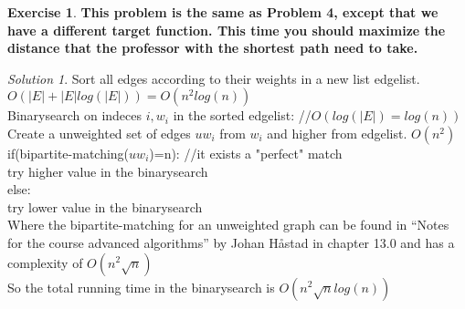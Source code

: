 \documentclass[a4paper,twoside=false,abstract=false,numbers=noenddot,
titlepage=false,headings=small,parskip=half,version=last]{scrartcl}
\theoremstyle{definition}
\newtheorem{exercise}{Exercise}
\theoremstyle{remark}
\newtheorem*{solution}{Solution}
\newcommand{\tab}{\hspace*{2em}}
\begin{document}
\begin{exercise}
{\bf
This problem is the same as Problem 4, except that we have a different target function.
This time you should maximize the distance that the professor with the shortest path need to take.
}
\end{exercise}
\begin{solution}

Sort all edges according to their weights in a new list edgelist.
$O(|E|+|E|log(|E|))=O(n^2log(n))$ \\

Binarysearch on indeces $i,w_i$ in the sorted edgelist: //$O(log(|E|)=log(n))$ \\
\tab    Create a unweighted set of edges $uw_i$ from $w_i$ and higher
from edgelist. $O(n^2)$\\
\tab    if(bipartite-matching($uw_i$)=n): //it exists a "perfect" match\\
\tab    \tab    try higher value in the binarysearch \\
\tab    else:\\
\tab    \tab    try lower value in the binarysearch \\

Where the bipartite-matching for an unweighted graph can be found in ``Notes
for the course advanced algorithms'' by Johan Håstad in chapter 13.0 and has a 
complexity of $O(n^2\sqrt{n})$ \\

So the total running time in the binarysearch is $O(n^2\sqrt{n}log(n))$

\end{solution}
\end{document}
